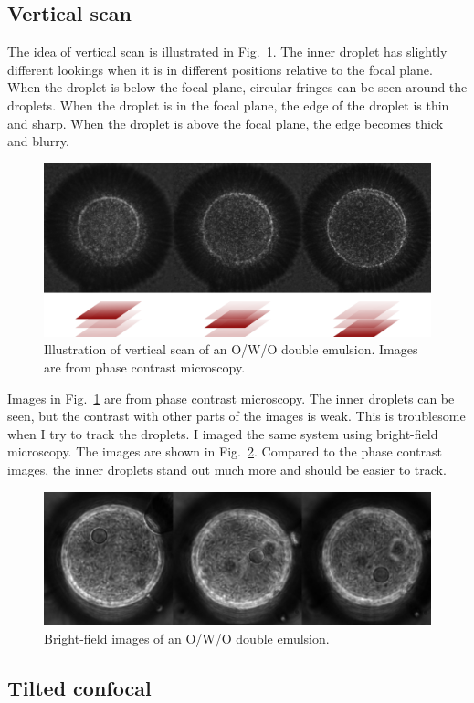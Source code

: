 \documentclass[onecolumn,aps, pre,amsmath,amssymb,longbibliography,12pt]{revtex4-2}
\begin{document}
\subsection{Vertical scan}
The idea of vertical scan is illustrated in Fig.~\ref{fig:manual-scan}.
The inner droplet has slightly different lookings when it is in different positions relative to the focal plane.
When the droplet is below the focal plane, circular fringes can be seen around the droplets.
When the droplet is in the focal plane, the edge of the droplet is thin and sharp.
When the droplet is above the focal plane, the edge becomes thick and blurry.

\begin{figure}[h]
  \includegraphics{manual-scan.png}
  \caption{Illustration of vertical scan of an O/W/O double emulsion. Images are from phase contrast microscopy.}
  \label{fig:manual-scan}
\end{figure}

Images in Fig.~\ref{fig:manual-scan} are from phase contrast microscopy.
The inner droplets can be seen, but the contrast with other parts of the images is weak.
This is troublesome when I try to track the droplets.
I imaged the same system using bright-field microscopy.
The images are shown in Fig.~\ref{fig:bright-field-images}.
Compared to the phase contrast images, the inner droplets stand out much more and should be easier to track.

\begin{figure}[h]
  \includegraphics{bright-field-images.png}
  \caption{Bright-field images of an O/W/O double emulsion.}
  \label{fig:bright-field-images}
\end{figure}


\subsection{Tilted confocal}
\end{document}
